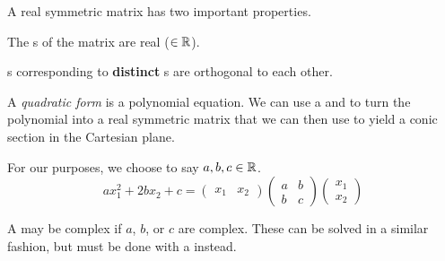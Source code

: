A real symmetric matrix has two important properties.
\begin{propertylist}
\item The s of the matrix are real ($\in \operatorname{\mathbb{R}}$).\label{prop:Real_Symmetric_Matrix-Real_Eigenvalues}
\item {}s corresponding to \textbf{distinct} s are orthogonal to each other.\label{prop:Real_Symmetric_Matrix-Distinct_Eigenvectors}
\end{propertylist}

\begin{definition}\label{def:Quadratic_Form}
  A \emph{quadratic form} is a polynomial equation.
  We can use a  and  to turn the polynomial into a real symmetric matrix that we can then use to yield a conic section in the Cartesian plane.

  For our purposes, we choose to say $a, b, c \in \operatorname{\mathbb{R}}$.
  \begin{equation}\label{eq:Quadratic_Form}
    ax_{1}^{2} + 2bx_{2} + c =
    \begin{pmatrix}
      x_{1} & x_{2}
    \end{pmatrix}
    \begin{pmatrix}
      a & b \\
      b & c
    \end{pmatrix}
    \begin{pmatrix}
      x_{1} \\ x_{2}
    \end{pmatrix}
  \end{equation}

  \begin{remark}\label{rmk:Complex_Quadratic_Form}
    A  may be complex if $a$, $b$, or $c$ are complex.
    These can be solved in a similar fashion, but must be done with a  instead.
  \end{remark}
\end{definition}

